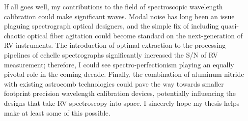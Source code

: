 \documentclass[11pt]{article}
\begin{document}
If all goes well, my contributions to the field of spectroscopic wavelength calibration could make significant waves. Modal noise has long been an issue plaguing spectrograph optical designers, and the simple fix of including quasi-chaotic optical fiber agitation could become standard on the next-generation of RV instruments. The introduction of optimal extraction to the processing pipelines of echelle spectrographs significantly increased the S/N of RV measurement; therefore, I could see spectro-perfectionism playing an equally pivotal role in the coming decade. Finally, the combination of aluminum nitride with existing astrocomb technologies could pave the way towards smaller footprint precision wavelength calibration devices, potentially influencing the designs that take RV spectroscopy into space. I sincerely hope my thesis helps make at least some of this possible.

\pagebreak



\end{document}
